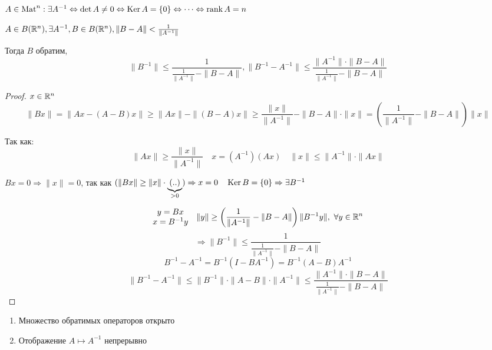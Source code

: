    $A \in \operatorname{Mat}^{n} : \exists A^{-1} \Leftrightarrow \det A \not= 0 \Leftrightarrow \operatorname{Ker} A = \{0\} \Leftrightarrow \dots \Leftrightarrow \operatorname{rank} A = n$

    \begin{theorem}
        $A \in B(\mathbb{R}^n), \exists A^{-1}, B \in B(\mathbb{R}^n), \| B - A \| < \frac{1}{\| A^{-1} \|}$
        \par Тогда $B$ обратим,
        \[
            \| B^{-1} \| \le \frac{1}{\frac{1}{\| A^{-1} \|}  - \| B - A \|}, \| B^{-1} - A^{-1} \| \le \frac{\| A^{-1} \| \cdot \| B - A \|}{\frac{1}{\| A^{-1} \|} - \| B - A \|}  
        \]
    \end{theorem}

    \begin{proof}
        $x \in \mathbb{R}^n$
        \[
            \| Bx \| = \| Ax - (A-B)x \| \ge \| Ax \| - \| (B-A)x \| \ge \frac{\| x \|}{\| A^{-1} \|} - \| B-A \| \cdot \| x \| = \left(\frac{1}{\|A^{-1}\|} - \|B-A\|\right) \|x\|
        \]
        \par Так как:
        \[
            \|Ax\| \ge \frac{\|x\|}{\|A^{-1}\|} \quad x = (A^{-1})(Ax) \quad \|x\| \le \|A^{-1}\| \cdot \|Ax\|  
        \]
        
            $Bx = 0 \Rightarrow \|x\| = 0$, так как  $(\|Bx\| \ge \|x\| \cdot \underbrace{(..)}_{>0}) \Rightarrow x = 0 \quad \operatorname{Ker} B = \{0\} \Rightarrow \exists B^{-1}$  
        
        \[
            \begin{matrix} y = Bx \\ x = B^{-1}y \end{matrix} \quad \|y\| \ge \left(\frac{1}{\|A^{-1}\|} - \|B-A\|\right)\|B^{-1}y\|, \ \forall y \in \mathbb{R}^n  
        \]
        \[
            \Rightarrow \|B^{-1}\| \le \frac{1}{\frac{1}{\|A^{-1}\|} - \|B-A\|}    
        \]
        \[
            B^{-1} - A^{-1} = B^{-1}(I-BA^{-1}) = B^{-1}(A-B)A^{-1}
        \]
        \[
            \|B^{-1}-A^{-1}\| \le \|B^{-1}\| \cdot \|A - B\| \cdot \|A^{-1}\| \le \frac{\|A^{-1}\| \cdot \|B-A\|}{\frac{1}{\|A^{-1}\|} - \|B-A\|}
        \]
    \end{proof}

    \begin{remark}\leavevmode
        \begin{enumerate}
            \item Множество обратимых операторов открыто
            \item Отображение $A \mapsto A^{-1}$ непрерывно
        \end{enumerate}
    \end{remark}
    
